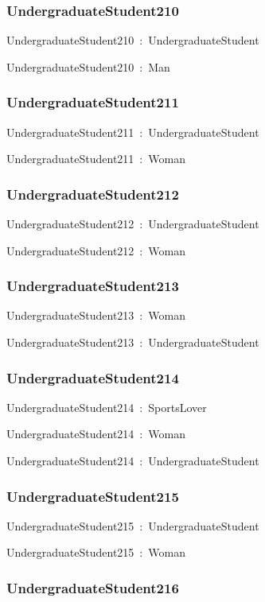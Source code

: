\documentclass{article}
\begin{document}
\subsubsection*{UndergraduateStudent210}

UndergraduateStudent210~:~UndergraduateStudent

UndergraduateStudent210~:~Man

\subsubsection*{UndergraduateStudent211}

UndergraduateStudent211~:~UndergraduateStudent

UndergraduateStudent211~:~Woman

\subsubsection*{UndergraduateStudent212}

UndergraduateStudent212~:~UndergraduateStudent

UndergraduateStudent212~:~Woman

\subsubsection*{UndergraduateStudent213}

UndergraduateStudent213~:~Woman

UndergraduateStudent213~:~UndergraduateStudent

\subsubsection*{UndergraduateStudent214}

UndergraduateStudent214~:~SportsLover

UndergraduateStudent214~:~Woman

UndergraduateStudent214~:~UndergraduateStudent

\subsubsection*{UndergraduateStudent215}

UndergraduateStudent215~:~UndergraduateStudent

UndergraduateStudent215~:~Woman

\subsubsection*{UndergraduateStudent216}
\end{document}
